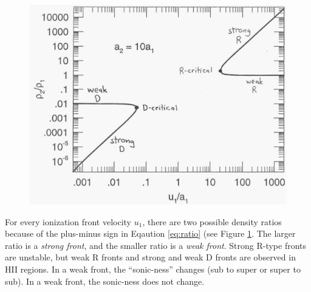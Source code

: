 \begin{figure}[!h]
\label{fig:shock}
\begin{center}
\includegraphics[width=\textwidth]{shock_plot.pdf}
\end{center}
\end{figure}

For every ionization front velocity $u_1$, there are two possible density ratios because of the 
plus-minus sign in Eqaution \ref{eq:ratio} (see Figure \ref{fig:shock}.  The larger ratio is a 
\emph{strong front}, and the smaller ratio is a \emph{weak front}.  Strong R-type fronts are 
unstable, but weak R fronts and strong and weak D fronts are observed in HII regions.  In a 
weak front, the ``sonic-ness'' changes (sub to super or super to sub).  In a weak front, 
the sonic-ness does not change.  

